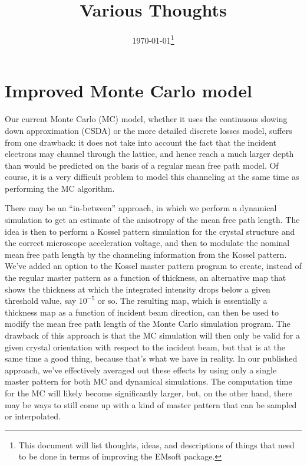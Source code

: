 \documentclass[DIV=calc, paper=letter, fontsize=11pt]{scrartcl}	 %
\title{Various Thoughts} %
\author{\vspace*{-0.7in}} %
\date{\today\protect\footnote{This document will list thoughts, ideas, and descriptions of things that need to be done in terms of improving the EMsoft package.}}
\begin{document}
\maketitle

\section{Improved Monte Carlo model}
Our current Monte Carlo (MC) model, whether it uses the continuous slowing down approximation (CSDA) or the more detailed discrete losses model,
suffers from one drawback: it does not take into account the fact that the incident electrons may channel through the lattice, and hence reach a 
much larger depth than would be predicted on the basis of a regular mean free path model.  Of course, it is a very difficult problem to model this channeling 
at the same time as performing the MC algorithm.  

There may be an ``in-between'' approach, in which we perform a dynamical simulation to get an estimate of the anisotropy of the mean free path length.  The idea is
then to perform a Kossel pattern simulation for the crystal structure and the correct microscope acceleration voltage, and then to modulate the nominal 
mean free path length by the channeling information from the Kossel pattern.  We've added an option to the Kossel master pattern program to create, instead of the regular master pattern as a function of thickness, an alternative map that shows the thickness at which the integrated intensity drops below a given threshold value, say
$10^{-5}$ or so.  The resulting map, which is essentially a thickness map as a function of incident beam direction, can then be used to modify the mean
free path length of the Monte Carlo simulation program.  The drawback of this approach is that the MC simulation will then only be valid for a given crystal
orientation with respect to the incident beam, but that is at the same time a good thing, because that's what we have in reality. In our published approach, we've
effectively averaged out these effects by using only a single master pattern for both MC and dynamical simulations.  The computation time for the MC will likely become significantly larger, but, on the other hand, there may be ways to still come up with a kind of master pattern that can be sampled or interpolated.
\end{document}
